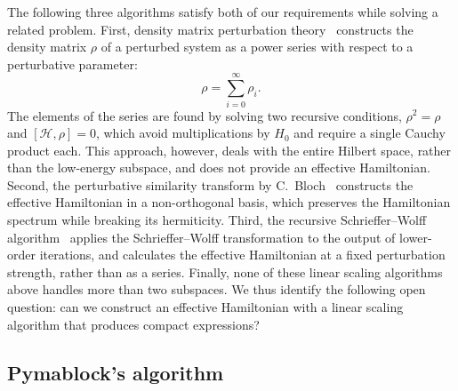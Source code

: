 The following three algorithms satisfy both of our requirements while solving a related problem.
First, density matrix perturbation theory~\cite{McWeeny_1962,McWeeny_1968,Truflandier_2020} constructs the density
matrix $\mathcal{\rho}$ of a perturbed system as a power series with respect to a perturbative parameter:
%
\begin{equation}
  \mathcal{\rho} = \sum_{i=0}^{\infty} \rho_i.
\end{equation}
%
The elements of the series are found by solving two recursive conditions, $\mathcal{\rho}^2 = \mathcal{\rho}$ and $[\mathcal{H}, \mathcal{\rho}]=0$, which avoid multiplications by $H_0$ and require a single Cauchy product each.
This approach, however, deals with the entire Hilbert space, rather than the low-energy subspace, and does not provide an effective Hamiltonian.
Second, the perturbative similarity transform by C.~Bloch~\cite{Bloch_1958,Bravyi_2011} constructs the effective Hamiltonian in a non-orthogonal basis, which preserves the Hamiltonian spectrum while breaking its hermiticity.
Third, the recursive Schrieffer--Wolff algorithm~\cite{Li_2022} applies the Schrieffer--Wolff transformation to the output of lower-order iterations, and calculates the effective Hamiltonian at a fixed perturbation strength, rather
than as a series.
Finally, none of these linear scaling algorithms above handles more than two subspaces.
We thus identify the following open question: can we construct an effective Hamiltonian with a linear scaling algorithm that produces compact expressions?

\subsection{Pymablock's algorithm}
\label{sec:pymablock_algorithm}

